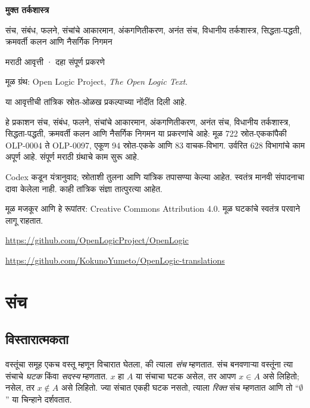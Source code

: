\documentclass[11pt,a4paper,openany]{book}
\theoremstyle{definition}
\begin{document}
\begin{titlepage}
\vspace*{2cm}
{\Huge\bfseries मुक्त तर्कशास्त्र\par}
\vspace{1cm}
{\LARGE संच, संबंध, फलने, संचांचे आकारमान, अंकगणितीकरण, अनंत संच, विधानीय तर्कशास्त्र, सिद्धता-पद्धती, क्रमवर्ती कलन आणि नैसर्गिक निगमन\par}
\vspace{1cm}
{\large मराठी आवृत्ती · दहा संपूर्ण प्रकरणे\par}
\vfill
मूळ ग्रंथ: Open Logic Project, \textit{The Open Logic Text}.\par
या आवृत्तीची तांत्रिक स्रोत-ओळख प्रकल्पाच्या नोंदींत दिली आहे.\par
हे प्रकाशन संच, संबंध, फलने, संचांचे आकारमान, अंकगणितीकरण, अनंत संच, विधानीय तर्कशास्त्र, सिद्धता-पद्धती, क्रमवर्ती कलन आणि नैसर्गिक निगमन या प्रकरणांचे आहे: मूळ 722 स्रोत-एककांपैकी OLP-0004 ते OLP-0097, एकूण 94 स्रोत-एकके आणि 83 वाचक-विभाग. उर्वरित 628 विभागांचे काम अपूर्ण आहे.
संपूर्ण मराठी ग्रंथाचे काम सुरू आहे.\par
Codex कडून यंत्रानुवाद; स्रोताशी तुलना आणि यांत्रिक तपासण्या केल्या आहेत.
स्वतंत्र मानवी संपादनाचा दावा केलेला नाही. काही तांत्रिक संज्ञा तात्पुरत्या आहेत.\par
मूळ मजकूर आणि हे रूपांतर: Creative Commons Attribution 4.0.
मूळ घटकांचे स्वतंत्र परवाने लागू राहतात.\par
\url{https://github.com/OpenLogicProject/OpenLogic}\par
\url{https://github.com/KokunoYumeto/OpenLogic-translations}
\end{titlepage}
\tableofcontents
\chapter{संच}








\section{विस्तारात्मकता}\label{sfr:set:bas:sec}

वस्तूंचा समूह एकच वस्तू {म्हणून} विचारात घेतला, की त्याला \emph{संच} म्हणतात.
संच बनवणाऱ्या वस्तूंना त्या संचाचे \emph{घटक} किंवा \emph{सदस्य} म्हणतात.
$x$ हा $A$ या संचाचा घटक असेल, तर आपण $x \in A$ असे लिहितो;
नसेल, तर $x \notin A$ असे लिहितो. ज्या संचात एकही घटक नसतो,
त्याला \emph{रिक्त} संच म्हणतात आणि तो ``$\emptyset$'' या चिन्हाने दर्शवतात.
\end{document}
